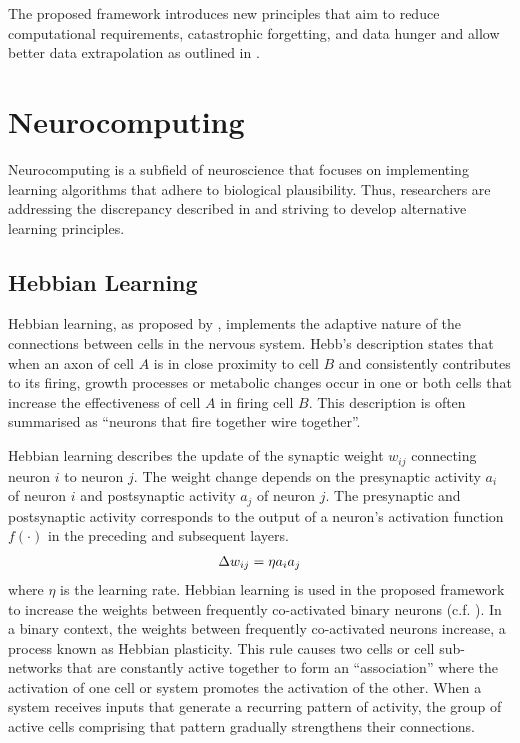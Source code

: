 The proposed framework introduces new principles that aim to reduce computational requirements, catastrophic forgetting, and data hunger and allow better data extrapolation as outlined in .


\section{Neurocomputing}
Neurocomputing is a subfield of neuroscience that focuses on implementing learning algorithms that adhere to biological plausibility. Thus, researchers are addressing the discrepancy described in  and striving to develop alternative learning principles.

\subsection{Hebbian Learning}
Hebbian learning, as proposed by , implements the adaptive nature of the connections between cells in the nervous system. Hebb's description states that when an axon of cell $A$ is in close proximity to cell $B$ and consistently contributes to its firing, growth processes or metabolic changes occur in one or both cells that increase the effectiveness of cell $A$ in firing cell $B$. This description is often summarised as ``neurons that fire together wire together''.

Hebbian learning describes the update of the synaptic weight $w_{ij}$ connecting neuron $i$ to neuron $j$. The weight change depends on the presynaptic activity $a_i$ of neuron $i$ and postsynaptic activity $a_j$ of neuron $j$. The presynaptic and postsynaptic activity corresponds to the output of a neuron's activation function $f(\cdot)$ in the preceding and subsequent layers.
%
\begin{align}\eqlbl{hebb_1}
	\Delta w_{ij} = \eta a_i a_j
\end{align}
%
where \(\eta\) is the learning rate.
Hebbian learning is used in the proposed framework to increase the weights between frequently co-activated binary neurons (c.f. ).
In a binary context, the weights between frequently co-activated neurons increase, a process known as Hebbian plasticity.
This rule causes two cells or cell sub-networks that are constantly active together to form an ``association'' where the activation of one cell or system promotes the activation of the other.
When a system receives inputs that generate a recurring pattern of activity, the group of active cells comprising that pattern gradually strengthens their connections.


